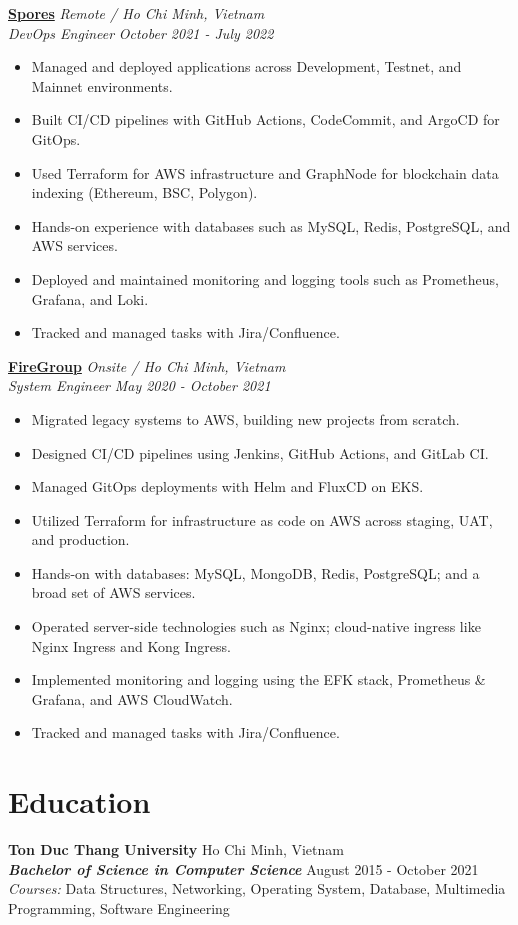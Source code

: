 \documentclass[11pt, a4paper]{article}
\begin{document}
\vspace{0.5em}
\textbf{\href{https://spores.app/}{Spores}} \hfill {\small\textit{Remote / Ho Chi Minh, Vietnam}} \\
\textit{DevOps Engineer} \hfill {\small\textit{October 2021 - July 2022}}
\begin{itemize}[leftmargin=*]
    \item Managed and deployed applications across Development, Testnet, and Mainnet environments.
    \item Built CI/CD pipelines with GitHub Actions, CodeCommit, and ArgoCD for GitOps.
    \item Used Terraform for AWS infrastructure and Graph\-Node for block\-chain data in\-dex\-ing (Ethereum, BSC, Polygon).
    \item Hands-on experience with databases such as MySQL, Redis, PostgreSQL, and AWS services.
    \item Deployed and maintained monitoring and logging tools such as Prometheus, Grafana, and Loki.
    \item Tracked and managed tasks with Jira/Confluence.
\end{itemize}

\vspace{0.5em}
\textbf{\href{https://firegroup.io/}{FireGroup}} \hfill {\small\textit{Onsite / Ho Chi Minh, Vietnam}} \\
\textit{System Engineer} \hfill {\small\textit{May 2020 - October 2021}}
\begin{itemize}[leftmargin=*]
    \item Migrated legacy systems to AWS, building new projects from scratch.
    \item Designed CI/CD pipelines using Jenkins, GitHub Actions, and GitLab CI.
    \item Managed GitOps deployments with Helm and FluxCD on EKS.
    \item Utilized Terraform for infrastructure as code on AWS across staging, UAT, and production.
    \item Hands-on with databases: MySQL, MongoDB, Redis, PostgreSQL; and a broad set of AWS services.
    \item Operated server-side technologies such as Nginx; cloud-native ingress like Nginx Ingress and Kong Ingress.
    \item Implemented monitoring and logging using the EFK stack, Prometheus \& Grafana, and AWS CloudWatch.
    \item Tracked and managed tasks with Jira/Confluence.
\end{itemize}


\section{Education}
\textbf{Ton Duc Thang University} \hfill Ho Chi Minh, Vietnam \\
\textit{\textbf{Bachelor of Science in Computer Science}} \hfill August 2015 - October 2021 \\
\textit{Courses:} Data Structures, Networking, Operating System, Database, Multimedia Programming, Software Engineering
\end{document}
